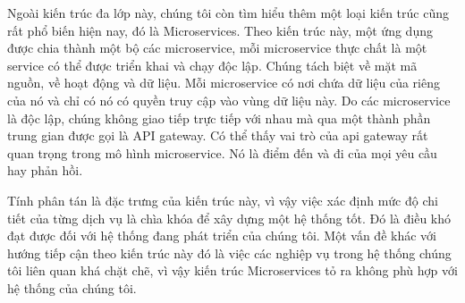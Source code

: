\par
Ngoài kiến trúc đa lớp này, chúng tôi còn tìm hiểu thêm một loại kiến trúc cũng
rất phổ biến hiện nay, đó là Microservices. Theo kiến trúc này, một ứng dụng
được chia thành một bộ các microservice, mỗi microservice thực chất là một
service có thể được triển khai và chạy độc lập. Chúng tách biệt về mặt mã
nguồn, về hoạt động và dữ liệu. Mỗi microservice có nơi chứa dữ liệu của riêng
của nó và chỉ có nó có quyền truy cập vào vùng dữ liệu này. Do các microservice
là độc lập, chúng không giao tiếp trực tiếp với nhau mà qua một thành phần
trung gian được gọi là API gateway. Có thể thấy vai trò của \acrshort*{api} gateway rất
quan trọng trong mô hình microservice. Nó là điểm đến và đi của mọi yêu cầu hay
phản hồi.
\par
Tính phân tán là đặc trưng của kiến trúc này, vì vậy việc xác định mức độ chi
tiết của từng dịch vụ là chìa khóa để xây dựng một hệ thống tốt. Đó là điều khó
đạt được đối với hệ thống đang phát triển của chúng tôi. Một vấn đề khác với
hướng tiếp cận theo kiến trúc này đó là việc các nghiệp vụ trong hệ thống chúng
tôi liên quan khá chặt chẽ, vì vậy kiến trúc Microservices tỏ ra không phù hợp
với hệ thống của chúng tôi.